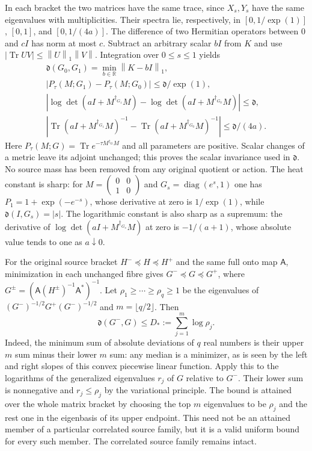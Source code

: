 \documentclass[11pt]{article}
\newcommand{\R}{\mathbb R}\newcommand{\C}{\mathbb C}
\newcommand{\norm}[1]{\left\lVert#1\right\rVert}
\newcommand{\Tr}{\operatorname{Tr}}\newcommand{\rank}{\operatorname{rank}}
\begin{document}
In each bracket the two matrices have the same trace, since $X_s,Y_s$
have the same eigenvalues with multiplicities. Their spectra lie,
respectively, in $[0,1/\exp(1)]$, $[0,1]$, and $[0,1/(4a)]$.
The difference of two Hermitian operators between $0$ and $cI$ has
norm at most $c$. Subtract an arbitrary scalar $bI$ from $K$ and use
$|\Tr UV|\le\norm U_1\norm V$. Integration over $0\le s\le1$ yields
\begin{equation}\tag{SD27}
\begin{gathered}
\mathfrak d(G_0,G_1)=\min_{b\in\R}\norm{K-bI}_1,\\
|P_\tau(M;G_1)-P_\tau(M;G_0)|\le\mathfrak d/\exp(1),\\
|\log\det(aI+M^{\dagger_{G_1}}M)
-\log\det(aI+M^{\dagger_{G_0}}M)|\le\mathfrak d,\\
|\Tr(aI+M^{\dagger_{G_1}}M)^{-1}
-\Tr(aI+M^{\dagger_{G_0}}M)^{-1}|\le\mathfrak d/(4a).
\end{gathered}
\end{equation}
Here $P_\tau(M;G)=\Tr e^{-\tau M^{\dagger_G}M}$ and all parameters
are positive. Scalar changes of a metric leave its adjoint unchanged;
this proves the scalar invariance used in $\mathfrak d$. No source
mass has been removed from any original quotient or action.
The heat constant is sharp: for
$M=\left(\begin{smallmatrix}0&0\\1&0\end{smallmatrix}\right)$ and
$G_s=\operatorname{diag}(e^s,1)$ one has
$P_1=1+\exp(-e^{-s})$, whose derivative at zero is $1/\exp(1)$,
while $\mathfrak d(I,G_s)=|s|$.
The logarithmic constant is also sharp as a supremum: the derivative
of $\log\det(aI+M^{\dagger_{G_s}}M)$ at zero is $-1/(a+1)$,
whose absolute value tends to one as $a\downarrow0$.

For the original source bracket $H^-\preceq H\preceq H^+$ and the
same full onto map $\mathsf A$, minimization in each unchanged fibre
gives $G^-\preceq G\preceq G^+$, where
$G^\pm=(\mathsf A(H^\pm)^{-1}\mathsf A^*)^{-1}$. Let
$\rho_1\ge\cdots\ge\rho_q\ge1$ be the eigenvalues of
$(G^-)^{-1/2}G^+(G^-)^{-1/2}$ and $m=\lfloor q/2\rfloor$. Then
\begin{equation}\tag{SD28}
\boxed{\mathfrak d(G^-,G)\le D_*:=\sum_{j=1}^m\log\rho_j.}
\end{equation}
Indeed, the minimum sum of absolute deviations of $q$ real numbers
is their upper $m$ sum minus their lower $m$ sum: any median is a
minimizer, as is seen by the left and right slopes of this convex
piecewise linear function. Apply this to the logarithms of the
generalized eigenvalues $r_j$ of $G$ relative to $G^-$. Their lower
sum is nonnegative and $r_j\le\rho_j$ by the variational principle.
The bound is attained over the whole matrix bracket by choosing the
top $m$ eigenvalues to be $\rho_j$ and the rest one in the eigenbasis
of its upper endpoint. This need not be an attained member of a
particular correlated source family, but it is a valid uniform bound
for every such member. The correlated source family remains intact.
\end{document}
